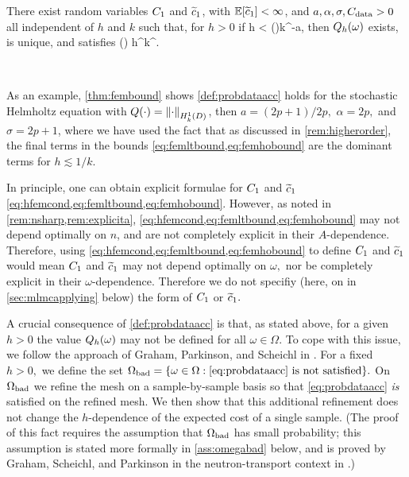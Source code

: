 \label{def:probdataacc}
There exist random variables $C_{1}$ and $\widetilde{c}_{1}$, with $\EXP{\cotilde} < \infty$, and $a, \alpha, \sigma, C_{\mathrm{data}} > 0$ all independent of $h$ and $k$ such that, for $h>0$ if
\beq\label{eq:probdataacc}
h < \Co(\omega)k^{-a},
\eeq
then $Q_{h}(\omega)$ exists, is unique, and satisfies
\beq\label{eq:Qhbound}
 \leq \cotilde(\omega) h^\alpha k^\sigma \Cdata.
\eeq
\eas


\

\bit
\item As an example, \cref{thm:fembound} shows \cref{def:probdataacc} holds for the stochastic Helmholtz equation with $Q(\cdot)=\NHokD{\cdot}$, then $a = (2p+1)/2p,$ $\alpha=2p,$ and $\sigma = 2p+1$, where we have used the fact that as discussed in \cref{rem:higherorder}, the final terms in the bounds \cref{eq:femltbound,eq:femhobound} are the dominant terms for $h \lesssim 1/k.$
  
\item In principle, one can obtain explicit formulae for $C_{1}$ and $\widetilde{c}_{1}$ \cref{eq:hfemcond,eq:femltbound,eq:femhobound}. However, as noted in \cref{rem:nsharp,rem:explicita}, \cref{eq:hfemcond,eq:femltbound,eq:femhobound} may not depend optimally on $n$, and are not completely explicit in their $A$-dependence. Therefore, using \cref{eq:hfemcond,eq:femltbound,eq:femhobound} to define $C_{1}$ and $\widetilde{c}_{1}$ would mean $C_{1}$ and $\widetilde{c}_{1}$ may not depend optimally on $\omega,$ nor be completely explicit in their $\omega$-dependence. Therefore we do not specifiy (here, on in \cref{sec:mlmcapplying} below) the form of $C_{1}$ or $\widetilde{c}_{1}.$


\eit
\ere

A crucial consequence of \cref{def:probdataacc} is that, as stated above, for a given $h>0$ the value $Q_{h}(\omega)$ may not be defined for all $\omega \in \Omega.$ To cope with this issue, we follow the approach of Graham, Parkinson, and Scheichl in \cite{GrPaSc:19}. For a fixed $h>0,$ we define the set $\Omegabad = \set{\omega \in \Omega \st \text{\cref{eq:probdataacc} is not satisfied}}.$ On $\Omega_{\mathrm{bad}}$ we refine the mesh on a sample-by-sample basis so that \cref{eq:probdataacc} \emph{is} satisfied on the refined mesh. We then show that this additional refinement does not change the $h$-dependence of the expected cost of a single sample. (The proof of this fact requires the assumption that $\Omega_{\mathrm{bad}}$ has small probability; this assumption is stated more formally in \cref{ass:omegabad} below, and is proved by Graham, Scheichl, and Parkinson in the neutron-transport context in \cite[Lemma 5.3]{GrPaSc:19}.)

